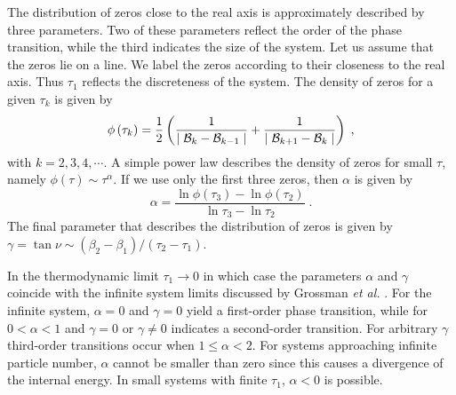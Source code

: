 \documentclass[rmp,preprint,aps,floatfix]{revtex4}
\begin{document}
The distribution of zeros close to the real axis is approximately described
by three parameters. Two of these parameters reflect the order of the
phase transition, while the third indicates the size of the system. 
Let us assume that the zeros lie on a line. We label the zeros according
to their closeness to the real axis. Thus $\tau_1$ reflects the discreteness
of the system. The density of zeros for a given $\tau_k$ is given by
\begin{equation}
\phi\left(\tau_k\right)=\frac{1}{2}
\left(\frac{1}{\mid {\cal B}_k -{\cal B}_{k-1}\mid} + 
\frac{1}{\mid {\cal B}_{k+1}-{\cal B}_k \mid}\right)\;,
\end{equation}
with $k=2,3,4,\cdots$. A simple power law describes the density of
zeros for small $\tau$, namely $\phi(\tau)\sim \tau^\alpha$. If we use
only the first three zeros, then $\alpha$ is given by
\begin{equation}
\alpha=\frac{\ln \phi(\tau_3) - \ln\phi(\tau_2)}{\ln\tau_3 -\ln\tau_2}\;.
\end{equation}
The final parameter that describes the distribution of zeros is given
by $\gamma=\tan\nu\sim (\beta_2-\beta_1)/(\tau_2-\tau_1)$. 

In the thermodynamic limit $\tau_1\rightarrow 0$ in which case the parameters
$\alpha$ and $\gamma$ coincide with the infinite system limits discussed 
by Grossman {\it et al.} \cite{gr67,gr69,gl69}. For the infinite system,
$\alpha=0$ and $\gamma=0$ yield a first-order phase transition, while
for $0<\alpha<1$ and $\gamma=0$ or $\gamma\ne 0$ indicates a second-order
transition. For arbitrary $\gamma$ third-order transitions occur when 
$1 \le \alpha < 2$. For systems approaching infinite particle number, 
$\alpha$ cannot be smaller than zero since this causes a divergence of the
internal energy. In small systems with finite $\tau_1$, $\alpha<0$ is 
possible. 
\end{document}
